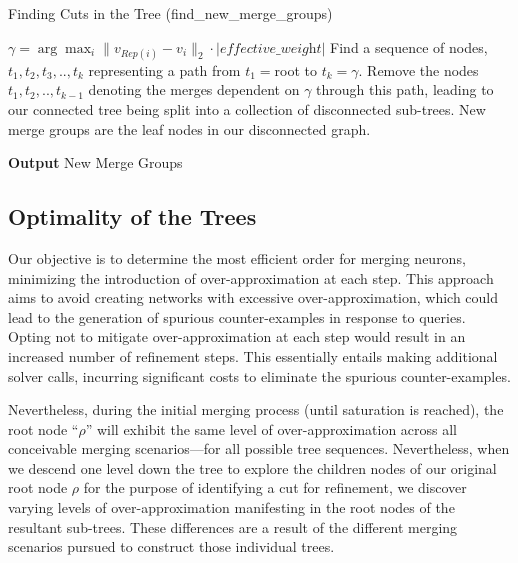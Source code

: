 \begin{algorithm}
    \caption{Finding Cuts in the Tree (find\_new\_merge\_groups)}
    \begin{algorithmic}[1]
        \State $\gamma= \arg \max_i \|v_{Rep(i)} -v_i \|_2 \cdot | \textit{effective\_weight}| $ 
        \State Find a sequence of nodes, $t_1,t_2,t_3,..,t_k$ representing a  path from $t_1=$root to $t_k=\gamma$.
        \State Remove the nodes $t_1,t_2,..,t_{k-1}$ denoting the merges dependent on $\gamma$ through this path, leading to our connected tree being split into a collection of disconnected sub-trees.
        \State New merge groups are the leaf nodes in our disconnected graph.
    \end{algorithmic}
    \hspace*{\algorithmicindent} \textbf{Output} New Merge Groups
\end{algorithm}

\subsection{Optimality of the Trees}
Our objective is to determine the most efficient order for merging neurons, minimizing the introduction of over-approximation at each step. This approach aims to avoid creating networks with excessive over-approximation, which could lead to the generation of spurious counter-examples in response to queries. Opting not to mitigate over-approximation at each step would result in an increased number of refinement steps. This essentially entails making additional solver calls, incurring significant costs to eliminate the spurious counter-examples.


Nevertheless, during the initial merging process (until saturation is reached), the root node ``$\rho$'' will exhibit the same level of over-approximation across all conceivable merging scenarios—for all possible tree sequences. Nevertheless, when we descend one level down the tree to explore the children nodes of our original root node $\rho$ for the purpose of identifying a cut for refinement, we discover varying levels of over-approximation manifesting in the root nodes of the resultant sub-trees. These differences are a result of the different merging scenarios pursued to construct those individual trees.

